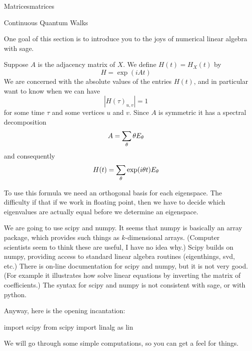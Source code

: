 \begin{chap}{Matrices}{matrices}
%
\begin{sect}{Continuous Quantum Walks}
%
\begin{para}
One goal of this section is to introduce you to the joys of numerical linear
algebra with sage.
\end{para}
%
\begin{para}
Suppose $A$ is the adjacency matrix of $X$. We define $H(t)=H_X(t)$ by
\[
    H =\exp(iAt)
\]
We are concerned with the absolute values of the entries $H(t)$, and in particular
want to know when we can have
\[
    |H(\tau)_{u,v}| =1
\]
for some time $\tau$ and some vertices $u$ and $v$. Since $A$ is symmetric 
it has a spectral decomposition
\[
    A =\sum_\theta \theta E_\theta
\]
and consequently
\[
    H(t) = \sum_\theta \exp(i\theta t)E_\theta
\]
\end{para}
%
\begin{para}
To use this formula we need an orthogonal basis for each eigenspace.
The difficulty if that if we work in floating point, then we have
to decide which eigenvalues are actually equal before we determine
an eigenspace.
\end{para}
%
\begin{para}
We are going to use scipy and numpy. 
It seems that numpy is basically an array package, which 
provides such things as $k$-dimensional arrays. (Computer scientists seem
to think these are useful, I have no idea why.) Scipy builds on numpy, providing
access to standard linear algebra routines (eigenthings, svd, etc.)
There is on-line documentation for scipy and numpy, but it is not very good.
(For example it illustrates how solve linear equations by inverting the matrix 
of coefficients.) The syntax for scipy and numpy is not consistent with sage, or 
with python. 
\end{para}
%
\begin{para}
Anyway, here is the opening incantation:
\end{para}
%
\begin{sagecode}
\begin{sageinput}
import scipy
from scipy import linalg as lin
\end{sageinput}
\end{sagecode}
%
\begin{para}
We will go through some simple computations, so you can get a feel for things.
\end{para}
%
\begin{sagecode}
\begin{sageinput}

\end{sageinput}
\end{sagecode}
\end{sect}
\end{chap}
